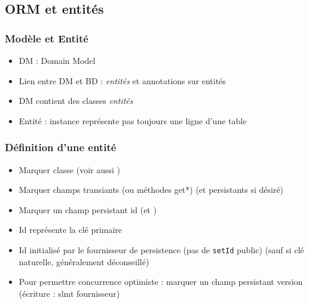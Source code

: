 \documentclass[english, french]{beamer}
\begin{document}
\subsection{ORM et entités}
\begin{frame}
	\frametitle{Modèle et Entité}
	\begin{itemize}
		\item DM : Domain Model
		\item Lien entre DM et BD : \emph{entités} et annotations sur entités
		\item DM contient des classes \emph{entités}
		\item Entité : instance représente {\tiny pas toujours} une ligne d’une table
	\end{itemize}
\end{frame}

\begin{frame}
	\frametitle{Définition d’une entité}
	\begin{itemize}
		\item Marquer classe  {\tiny (voir aussi )}
		\item Marquer champs transiants {\tiny (ou méthodes get*)}  {\tiny (et persistants  si désiré)}
		\item Marquer un champ persistant id  (et )
		\item Id représente la clé primaire
		\item Id initialisé par le fournisseur de persistence (pas de \texttt{setId} public) {\tiny (sauf si clé naturelle, généralement déconseillé)}
		\item Pour permettre concurrence optimiste : marquer un champ persistant version  (écriture : slmt fournisseur)
	\end{itemize}
\end{frame}
\end{document}
